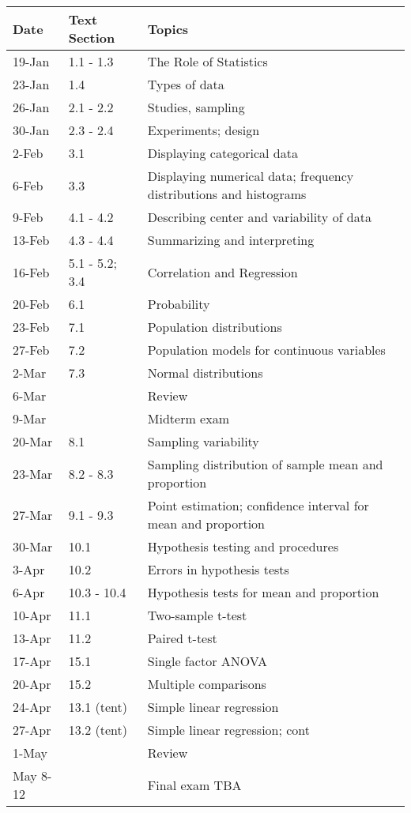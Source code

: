 \begin{table}[!ht]
	\centering
	\begin{tabular}{|l|l|l|}
		\hline
		Date & Text Section & Topics \\ \hline
		19-Jan & 1.1 - 1.3   & The Role of Statistics \\ \hline
		23-Jan & 1.4 &  Types of data \\ \hline
		26-Jan & 2.1 - 2.2  & Studies, sampling \\ \hline
		30-Jan & 2.3 - 2.4  & Experiments; design \\ \hline
		2-Feb & 3.1 & Displaying categorical data \\ \hline
		6-Feb & 3.3 & Displaying numerical data; frequency distributions and histograms \\ \hline
		9-Feb & 4.1 - 4.2 & Describing center and variability of data \\ \hline
		13-Feb & 4.3 - 4.4  & Summarizing and interpreting  \\ \hline
		16-Feb & 5.1 - 5.2; 3.4  & Correlation and Regression \\ \hline
		20-Feb & 6.1 & Probability  \\ \hline
		23-Feb & 7.1 & Population distributions \\ \hline
		27-Feb & 7.2 & Population  models for continuous variables \\ \hline
		2-Mar & 7.3 & Normal distributions \\ \hline
		6-Mar & ~ & Review  \\ \hline
		9-Mar & ~ & Midterm exam \\ \hline
		20-Mar & 8.1 & Sampling variability \\ \hline
		23-Mar & 8.2 - 8.3 & Sampling distribution of sample mean and proportion \\ \hline
		27-Mar & 9.1 - 9.3 & Point estimation; confidence interval for mean and proportion \\ \hline
		30-Mar & 10.1 & Hypothesis testing and procedures \\ \hline
		3-Apr & 10.2 & Errors in hypothesis tests \\ \hline
		6-Apr & 10.3 - 10.4 & Hypothesis tests for mean and proportion \\ \hline
		10-Apr & 11.1 & Two-sample t-test \\ \hline
		13-Apr & 11.2 & Paired t-test \\ \hline
		17-Apr & 15.1 & Single factor ANOVA \\ \hline
		20-Apr & 15.2 & Multiple comparisons \\ \hline
		24-Apr & 13.1 (tent) & Simple linear regression \\ \hline
		27-Apr & 13.2 (tent) & Simple linear regression; cont \\ \hline
		1-May & ~ & Review \\ \hline
		May 8-12 & ~ & Final exam TBA \\ \hline
	\end{tabular}
\end{table}